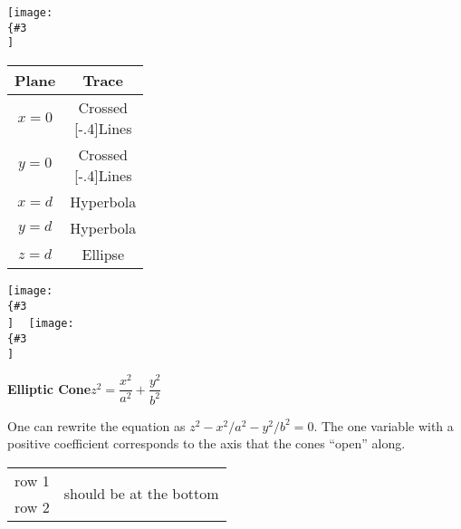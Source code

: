 \documentclass[10pt]{book}
\newcommand{\myincludeasythree}[3]{\texttt{[image: \\\{\#3\\]}}}
\begin{document}
\noindent
\begin{minipage}{\linewidth}
 \captionsetup{type=figure}%
 \noindent%
  \myincludeasythree{width=\linewidth,
3Droll=0,
3Dortho=0.0067,
3Dc2c=.68 .68 .25,
3Dcoo=0 0 0,
3Droo=150}{width=\linewidth}{figures/figquadric_cone_3D}
\hfill
  \begin{tabular}{cc}
   \textbf{Plane}  & \textbf{Trace} \\\midrule
   $x=0$ & \parbox{5em}{\centering Crossed\\[-.4\baselineskip]Lines}\medskip\\
   $y=0$ & \parbox{5em}{\centering Crossed\\[-.4\baselineskip]Lines}\bigskip\\
   $x=d$ & Hyperbola\\
   $y=d$ & Hyperbola\\
   $z=d$ & Ellipse
  \end{tabular}
\hfill
  \myincludeasythree{width=.8\marginparwidth,
3Droll=0,
3Dortho=0.0067,
3Dc2c=.68 .68 .25,
3Dcoo=0 0 0,
3Droo=150}{width=.8\marginparwidth}{figures/figquadric_coneb_3D}
~%
  \myincludeasythree{width=.8\marginparwidth,
3Droll=0,
3Dortho=0.0067,
3Dc2c=.68 .68 .25,
3Dcoo=0 0 0,
3Droo=150}{width=.8\marginparwidth}{figures/figquadric_conec_3D}
 \caption{\quad\textbf{Elliptic Cone}\qquad$z^2=\dfrac{x^2}{a^2}+\dfrac{y^2}{b^2}$}
 \label{fig_elliptic_cone}
 \bigskip
 \begin{minipage}{.75\linewidth}
  One can rewrite the equation as $z^2-x^2/a^2-y^2/{b^2} = 0$. The one variable with a positive coefficient corresponds to the axis that the cones ``open'' along. 
 \end{minipage}
\end{minipage}

\begin{tabular}{cc}
row 1 & \multirow{15}{*}{should be at the bottom} \\
row 2
\end{tabular}
\end{document}
